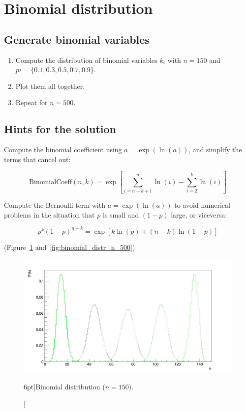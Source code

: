 

\section{Binomial distribution}
\label{exer:binomial_distr}

\subsection{Generate binomial variables}

\begin{enumerate}
	\item Compute the distribution of binomial variables $k_{i}$ with $n = 150$ and $pi = \{ 0.1, 0.3, 0.5, 0.7, 0.9 \}$.
	\item Plot them all together.
	\item Repeat for $n = 500$.
\end{enumerate}

\subsection{Hints for the solution}

Compute the binomial coefficient using $a = \exp( \ln(a) )$, and simplify the terms that cancel out:

\begin{equation}
	\mathrm{BinomialCoeff}(n, k) 
	= \exp \left[ \sum_{i = n - k + 1}^{n}{\ln(i)} - \sum_{i = 2}^{k}{\ln(i)} \right]
\end{equation}

Compute the Bernoulli term with $a = \exp( \ln(a) )$ to avoid numerical problems in the situation that $p$ is small and $(1 - p)$ large, or viceversa:

\begin{equation}
	p^{k}(1 - p)^{n - k} = \exp \left[ k \ln(p) + (n - k) \ln(1 - p) \right]
\end{equation}

(Figure~\ref{fig:binomial_distr_n_150} and~\ref{fig:binomial_distr_n_500})

\begin{figure}
	\includegraphics{exercise/binomial_distr_n_150.png}
	\caption[Binomial distribution ($n = 150$).][6pt]{Binomial distribution ($n = 150$).}
	\label{fig:binomial_distr_n_150}
\end{figure}

